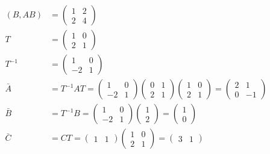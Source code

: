 \documentclass[a4paper,11pt,fleqn]{jreport}
\begin{document}
\begin{align*}
	(B, AB) 
	& =
	\left (
	\begin{array}{cc}
	 1 & 2\\ 
	 2 & 4
	\end{array}
	\right )
\\
	T
	&=
	\left (
	\begin{array}{cc}
	 1 & 0\\ 
	 2 & 1
	\end{array}
	\right )
\\
	T^{-1}
	&=
	\left (
	\begin{array}{cc}
	 1 & 0\\ 
	 -2 & 1
	\end{array}
	\right )
\\
	\bar{A} 
	&= 
	T^{-1} A T
	=
	\left (
	\begin{array}{cc}
	 1 & 0\\ 
	 -2 & 1
	\end{array}
	\right )
	\left (
	\begin{array}{cc}
	 0 & 1 \\
	 2 & 1
	\end{array}
	\right )
	\left (
	\begin{array}{cc}
	 1 & 0\\ 
	 2 & 1
	\end{array}
	\right )
	=
	\left (
	\begin{array}{cc}
	 2 & 1\\ 
	 0 & -1
	\end{array}
	\right )
\\
	\bar{B}
	&=
	T^{-1}B
	=
	\left (
	\begin{array}{cc}
	 1 & 0\\ 
	 -2 & 1
	\end{array}
	\right )
	\left (
	\begin{array}{c}
	 1 \\ 2 
	\end{array}
	\right )
	=
	\left (
	\begin{array}{c}
	 1 \\ 0
	\end{array}
	\right )
\\
	\bar{C}
	&=
	C T
	=
	\left (
	\begin{array}{cc}
	 1 & 1  
	\end{array}
	\right )
	\left (
	\begin{array}{cc}
	 1 & 0\\ 
	 2 & 1
	\end{array}
	\right )
	=
	\left (
	\begin{array}{cc}
	 3 & 1  
	\end{array}
	\right )
\end{align*}
\end{document}
